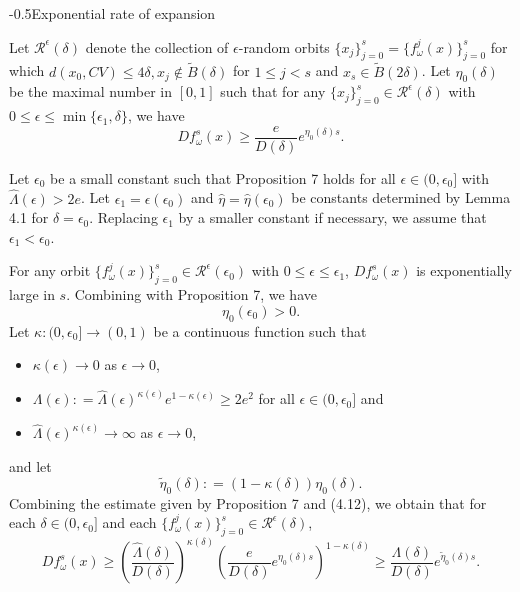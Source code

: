 \documentclass[11pt,oneside]{article}
\makeatletter
\theoremstyle{plain}
\numberwithin{equation}{section}
\numberwithin{figure}{section}
\numberwithin{table}{section}
\renewcommand{\subsection}{\@startsection{subsection}{1}{0mm}
{-\baselineskip}{0.5\baselineskip}{\large\bf\leftline}}
\makeatother
\begin{document}
\subsection{Exponential rate of expansion}



Let $\mathcal R^{\epsilon}(\delta)$ denote the collection of $\epsilon$-random orbits $\{ x_j \}_{j=0}^s = \{ f_{\omega}^j(x) \}_{j=0}^s$ for which $d(x_0, CV) \leq 4 \delta, x_j \notin \tilde B(\delta)$ for $1 \leq j < s$ and $x_s \in \tilde B(2 \delta)$. Let $\eta_0(\delta)$ be the maximal number in $[0, 1]$ such that for any $\{ x_j \}_{j=0}^s  \in \mathcal R^{\epsilon}(\delta)$ with $0 \leq \epsilon \leq \min\{ \epsilon_1, \delta \}$, we have
\begin{equation}
D f_{\omega}^s(x) \geq \frac{e}{D(\delta)} e^{\eta_0(\delta) s}.
\end{equation}

Let $\epsilon_0$ be a small constant such that Proposition 7 holds for all $\epsilon \in (0, \epsilon_0]$ with $\hat \Lambda(\epsilon) > 2e$. Let $\epsilon_1 = \epsilon(\epsilon_0)$ and $\hat \eta = \hat \eta(\epsilon_0)$ be constants determined by Lemma 4.1 for $\delta = \epsilon_0$. Replacing $\epsilon_1$ by a smaller constant if necessary, we assume that $\epsilon_1 < \epsilon_0$. 

For any orbit $\{ f_{\omega}^j(x) \}_{j=0}^s \in \mathcal R^{\epsilon}(\epsilon_0)$ with $0 \leq \epsilon \leq \epsilon_1$, $Df_{\omega}^s(x)$ is exponentially large in $s$. Combining with Proposition 7, we have
\begin{equation}
\eta_0(\epsilon_0) > 0. 
\end{equation}
Let $\kappa: (0, \epsilon_0] \to (0, 1)$ be a continuous function such that
\begin{itemize}
\item[(1)] $\kappa(\epsilon) \to 0$ as $\epsilon \to 0$,

\item[(2)] $\Lambda(\epsilon) : = \hat \Lambda(\epsilon)^{\kappa(\epsilon)} e^{1 - \kappa(\epsilon)} \geq 2e^2$ for all $\epsilon \in (0, \epsilon_0]$ and 

\item[(3)] $\hat \Lambda(\epsilon)^{\kappa(\epsilon)} \to \infty$ as $\epsilon \to 0$,
\end{itemize}
and let
\begin{equation}
\tilde \eta_0(\delta) : = (1 - \kappa(\delta)) \eta_0(\delta).
\end{equation}
Combining the estimate given by Proposition 7 and (4.12), we obtain that for each $\delta \in (0, \epsilon_0]$ and each $\{ f_{\omega}^j(x) \}_{j=0}^s \in \mathcal R^{\epsilon}(\delta)$,
\begin{equation}
Df_{\omega}^s(x) \geq \left( \frac{\hat \Lambda(\delta)}{D(\delta)}\right)^{\kappa(\delta)} \left(  \frac{e}{D(\delta)} e^{\eta_0(\delta) s}\right)^{1 - \kappa(\delta)} \geq \frac{\Lambda(\delta)}{D(\delta)} e^{\tilde \eta_0(\delta) s}.
\end{equation}
\end{document}
